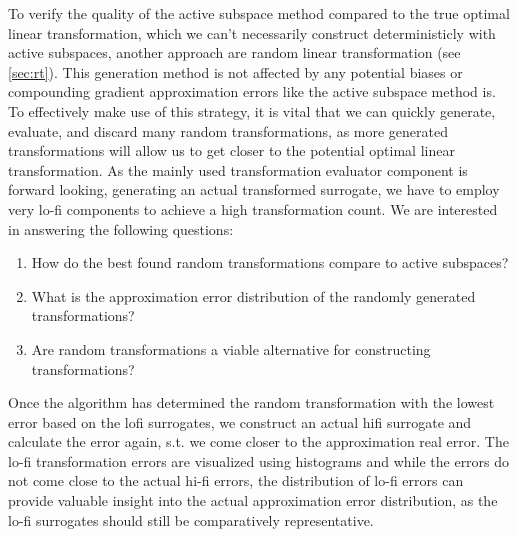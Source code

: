 \documentclass[
  a4paper,  %
  twoside,  %
  bibliography=totoc,
  headsepline,
  cleardoublepage=empty,
  parskip=half,
  draft=false
]{scrbook}
\begin{document}
To verify the quality of the active subspace method compared to the true optimal linear transformation, which we can't necessarily construct deterministicly with active subspaces, another approach are random linear transformation (see \cref{sec:rt}).
This generation method is not affected by any potential biases or compounding gradient approximation errors like the active subspace method is.
To effectively make use of this strategy, it is vital that we can quickly generate, evaluate, and discard many random transformations, as more generated transformations will allow us to get closer to the potential optimal linear transformation.
As the mainly used transformation evaluator component is forward looking, \ie generating an actual transformed surrogate, we have to employ very lo-fi components to achieve a high transformation count.
We are interested in answering the following questions:
\begin{enumerate}
\item How do the best found random transformations compare to active subspaces?
\item What is the approximation error distribution of the randomly generated transformations?
\item Are random transformations a viable alternative for constructing transformations?
\end{enumerate}
%
Once the algorithm has determined the random transformation with the lowest error based on the lofi surrogates, we construct an actual hifi surrogate and calculate the error again, s.t. we come closer to the approximation real error.
The lo-fi transformation errors are visualized using histograms and while the errors do not come close to the actual hi-fi errors, the distribution of lo-fi errors can provide valuable insight into the actual approximation error distribution, as the lo-fi surrogates should still be comparatively representative.
\end{document}
